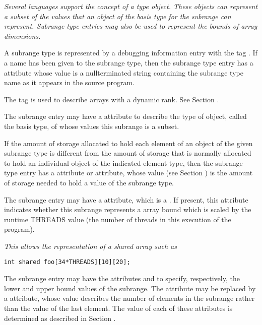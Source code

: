 \textit{Several languages support the concept of a 
type object. These objects can represent a subset of the
values that an object of the basis type for the subrange can
represent. 
Subrange type entries may also be used to represent
the bounds of array dimensions.}

A subrange type is represented by a debugging information
entry with the 
tag \DWTAGsubrangetypeTARG. 
If a name has been
given to the subrange type, then the subrange type entry
has a \DWATname{} attribute
whose value is a null\dash terminated
string containing the subrange type name as it appears in
the source program.

The tag \DWTAGgenericsubrange{} is
used to describe arrays with a dynamic rank. See Section
.

The subrange entry may have 
a \DWATtype{} attribute to describe
the type of object, called the basis type, of whose values
this subrange is a subset.

If the amount of storage allocated to hold each element of an
object of the given subrange type is different from the amount
of storage that is normally allocated to hold an individual
object of the indicated element type, then the subrange
type entry has a 
\DWATbytesize{} attribute or 
\DWATbitsize{}
attribute, whose value 
(see Section )
is the amount of
storage needed to hold a value of the subrange type.

The 
\hypertarget{chap:DWATthreadsscaledupcarrayboundthreadsscalfactor}{}
subrange entry may have 
a 
\DWATthreadsscaled{} attribute,
which is a . 
If present, this attribute indicates whether
this subrange represents a  array bound which is scaled
by the runtime THREADS value (the number of  threads in
this execution of the program).

\textit{This allows the representation of a  shared array such as}

\begin{lstlisting}[numbers=none]
int shared foo[34*THREADS][10][20];
\end{lstlisting}

The 
\hypertarget{chap:DWATlowerboundlowerboundofsubrange}{}
subrange 
\hypertarget{chap:DWATupperboundupperboundofsubrange}{}
entry may have the attributes 
\DWATlowerbound{}
and \DWATupperbound{}
 to specify, respectively, the lower
and upper bound values of the subrange. The 
\DWATupperbound{}
attribute 
\hypertarget{chap:DWATcountelementsofsubrangetype}{}
may 
be 
replaced by a 
\DWATcount{} attribute, 
whose
value describes the number of elements in the subrange rather
than the value of the last element. The value of each of
these attributes is determined as described in 
Section .

